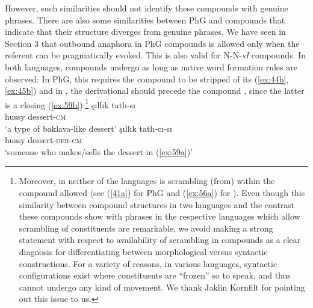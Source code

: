 \documentclass[output=paper]{LSP/langsci}
\begin{document}
However, such similarities should not identify these compounds with genuine phrases. There are also some similarities between PhG and  compounds that indicate that their structure diverges from genuine phrases. We have seen in Section 3 that outbound anaphora in PhG compounds is allowed only when the referent can be pragmatically evoked. This is also valid for  N-N-\textit{sI} compounds.  In both languages, compounds undergo  as long as native word formation rules are observed: In PhG, this requires the compound to be stripped of its  (\ref{ex:44b}, \ref{ex:45b}) and in , the derivational  should precede the compound , since the latter is a closing  (\ref{ex:59b}):\footnote{Moreover, in neither of the languages is scrambling (from) within the compound allowed (see (\ref{41a}) for PhG and (\ref{ex:56a}) for ). Even though this similarity between compound structures in two languages and the contrast these compounds show with  phrases in the respective languages which allow scrambling of constituents are remarkable, we avoid making a strong statement with respect to availability of scrambling in compounds as a clear diagnosis for differentiating between morphological versus syntactic constructions. For a variety of reasons, in various languages, syntactic configurations exist where constituents are “frozen” so to speak, and thus cannot undergo any kind of movement. We thank Jaklin Kornfilt for pointing out this issue to us.}
\ea\label{ex:59}
	\ea\label{ex:59a}
		\gll	şıllık tatlı-sı\\
				hussy dessert-\textsc{cm} \\
		\glt `a type of baklava-like dessert'
	\ex\label{ex:59b}
		\gll   şıllık tatlı-cı-sı\\
				hussy dessert-\textsc{der}-\textsc{cm} \\
		\glt `someone who makes/sells the dessert in (\ref{ex:59a})'
	\z
\z
\end{document}
